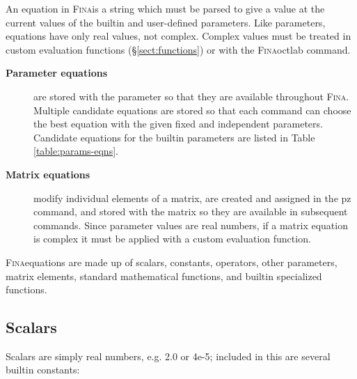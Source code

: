\documentclass[10pt,openany,twoside]{book}
\numberwithin{equation}{section}   %
\newcommand{\Cmd}[1]{{\sf #1}}
\newcommand{\Fina}{{\normalfont\scshape Fina\:}}
\newcommand{\Sectref}[1]{\S\ref{#1}}
\newcommand{\Tableref}[1]{Table \ref{#1}}
\begin{document}
An equation in \Fina is a string which must be parsed to
give a value at the current values of the builtin and user-defined
parameters. Like parameters, equations have only real values, not
complex. Complex values must be treated in custom evaluation functions
(\Sectref{sect:functions}) or with the \Fina \Cmd{octlab} command.

\begin{description}
\item[{\bf Parameter equations}]\label{sect:parameter-eqns} are stored with
the parameter so that they are available throughout \Fina. Multiple candidate
equations are stored so that each command can choose the best
equation with the given fixed and independent parameters.
Candidate equations for the builtin parameters are
listed in \Tableref{table:params-eqns}.
\item[{\bf Matrix equations}]\label{sect:matrix-eqns} modify individual elements
of a matrix, are created and assigned in the \Cmd{pz} command, and stored
with the matrix so they are available in subsequent commands. Since parameter
values are real numbers, if a matrix equation is complex it must be applied
with a custom evaluation function.
\end{description}

\Fina equations are made up of scalars,
constants,
operators,
other parameters,
matrix elements,
standard mathematical functions, and
builtin specialized functions.

\subsection{Scalars}\label{sect:scalars}
Scalars are simply real numbers, e.g. 2.0 or 4e-5; included in this
are several builtin constants: 

\end{document}

